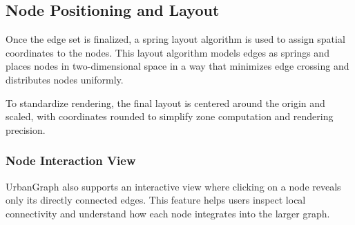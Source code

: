 \documentclass[12pt]{article}
\begin{document}
\subsection{Node Positioning and Layout}

Once the edge set is finalized, a spring layout algorithm is used to assign spatial coordinates to the nodes. This layout algorithm models edges as springs and places nodes in two-dimensional space in a way that minimizes edge crossing and distributes nodes uniformly.

To standardize rendering, the final layout is centered around the origin and scaled, with coordinates rounded to simplify zone computation and rendering precision.

\subsubsection*{Node Interaction View}

UrbanGraph also supports an interactive view where clicking on a node reveals only its directly connected edges. This feature helps users inspect local connectivity and understand how each node integrates into the larger graph.
\end{document}
